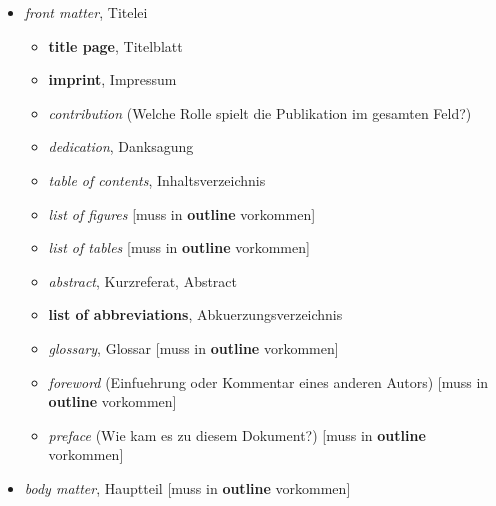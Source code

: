   \begin{itemize}
  \itemsep1pt\parskip0pt
  \item
    \emph{front matter}, Titelei

    \begin{itemize}
    \itemsep1pt\parskip0pt
    \item
      \textbf{title page}, Titelblatt
    \item
      \textbf{imprint}, Impressum
    \item
      \emph{contribution} (Welche Rolle spielt die Publikation im
      gesamten Feld?)
    \item
      \emph{dedication}, Danksagung
    \item
      \emph{table of contents}, Inhaltsverzeichnis
    \item
      \emph{list of figures} {[}muss in \textbf{outline} vorkommen{]}
    \item
      \emph{list of tables} {[}muss in \textbf{outline} vorkommen{]}
    \item
      \emph{abstract}, Kurzreferat, Abstract
    \item
      \textbf{list of abbreviations}, Abkuerzungsverzeichnis
    \item
      \emph{glossary}, Glossar {[}muss in \textbf{outline} vorkommen{]}
    \item
      \emph{foreword} (Einfuehrung oder Kommentar eines anderen Autors)
      {[}muss in \textbf{outline} vorkommen{]}
    \item
      \emph{preface} (Wie kam es zu diesem Dokument?) {[}muss in
      \textbf{outline} vorkommen{]}
    \end{itemize}
  \item
    \emph{body matter}, Hauptteil {[}muss in \textbf{outline}
    vorkommen{]}


\end{itemize}

